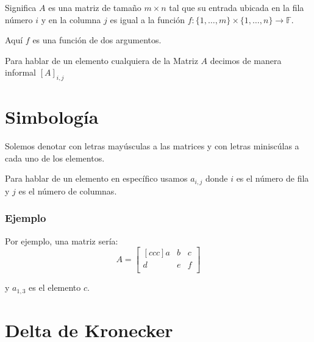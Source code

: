 \documentclass[12pt, fleqn]{report}                             %
\begin{document}
                Significa $A$ es una matriz de tamaño $m \times n$ tal que su entrada
                ubicada en la fila número $i$ y en la columna $j$ es igual a la función
                $f: \{1, \dots, m\} \times \{1, \dots, n\} \to \mathbb{F}$.
                
                Aquí $f$ es una función de dos argumentos.
                
                Para hablar de un elemento cualquiera de la Matriz $A$ decimos de manera
                informal $[A]_{i,j}$


        \clearpage
        \section{Simbología}

            Solemos denotar con letras mayúsculas a las matrices y con letras miniscúlas
            a cada uno de los elementos.

            Para hablar de un elemento en específico usamos $a_{i,j}$ donde $i$ es el
            número de fila y $j$ es el número de columnas.


            \subsubsection*{Ejemplo}

                Por ejemplo, una matriz sería:
                \begin{equation*}
                    A =
                    \begin{bmatrix}[ccc]
                        a & b & c   \\
                        d & e & f   \\
                    \end{bmatrix}
                \end{equation*}

                y $a_{1,3}$ es el elemento $c$.


        \section{Delta de Kronecker}
\end{document}
